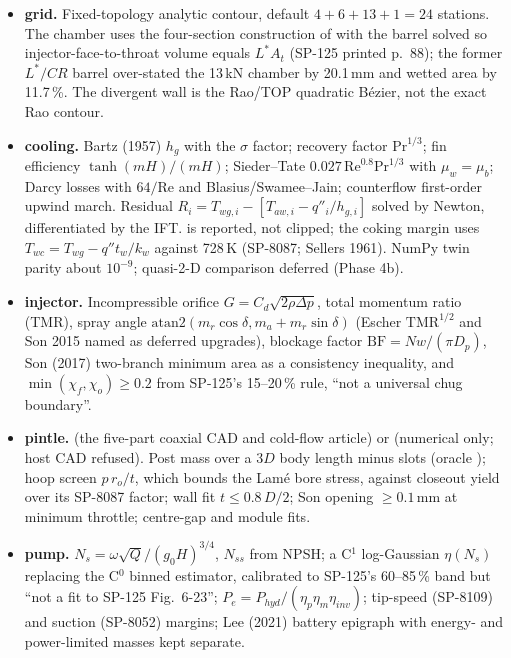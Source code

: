 \begin{itemize}
\item \textbf{grid.} Fixed-topology analytic contour, default $4+6+13+1=24$ stations. The chamber uses the four-section construction of  with the barrel solved so injector-face-to-throat volume equals $L^*A_t$ (SP-125 printed p.~88); the former $L^*/CR$ barrel over-stated the 13\,kN chamber by 20.1\,mm and wetted area by 11.7\,\%. The divergent wall is the Rao/TOP quadratic B\'ezier, not the exact Rao contour.
\item \textbf{cooling.} Bartz (1957) $h_g$ with the $\sigma$ factor; recovery factor $\mathrm{Pr}^{1/3}$; fin efficiency $\tanh(mH)/(mH)$; Sieder--Tate $0.027\,\mathrm{Re}^{0.8}\mathrm{Pr}^{1/3}$ with $\mu_w=\mu_b$; Darcy losses with $64/\mathrm{Re}$ and Blasius/Swamee--Jain; counterflow first-order upwind march. Residual $R_i=T_{wg,i}-[T_{aw,i}-q''_i/h_{g,i}]$ solved by Newton, differentiated by the IFT.  is reported, not clipped; the coking margin uses $T_{wc}=T_{wg}-q''t_w/k_w$ against 728\,K (SP-8087; Sellers 1961). NumPy twin parity about $10^{-9}$; quasi-2-D comparison deferred (Phase 4b).
\item \textbf{injector.} Incompressible orifice $G=C_d\sqrt{2\rho\Delta p}$, total momentum ratio (TMR), spray angle $\mathrm{atan2}(m_r\cos\delta,m_a+m_r\sin\delta)$ (Escher $\mathrm{TMR}^{1/2}$ and Son 2015 named as deferred upgrades), blockage factor $\mathrm{BF}=Nw/(\pi D_p)$, Son (2017) two-branch minimum area as a consistency inequality, and $\min(\chi_f,\chi_o)\ge0.2$ from SP-125's 15--20\,\% rule, ``not a universal chug boundary''.
\item \textbf{pintle.}  (the five-part coaxial CAD and cold-flow article) or  (numerical only; host CAD refused). Post mass over a 3$D$ body length minus slots (oracle ); hoop screen $p\,r_o/t$, which bounds the Lam\'e bore stress, against closeout yield over its SP-8087 factor; wall fit $t\le0.8\,D/2$; Son opening $\ge0.1$\,mm at minimum throttle; centre-gap and module fits.
\item \textbf{pump.} $N_s=\omega\sqrt Q/(g_0H)^{3/4}$, $N_{ss}$ from NPSH; a C$^1$ log-Gaussian $\eta(N_s)$ replacing the C$^0$ binned estimator, calibrated to SP-125's 60--85\,\% band but ``not a fit to SP-125 Fig.~6-23''; $P_e=P_{hyd}/(\eta_p\eta_m\eta_{inv})$; tip-speed (SP-8109) and suction (SP-8052) margins; Lee (2021) battery epigraph with energy- and power-limited masses kept separate.

\end{itemize}
